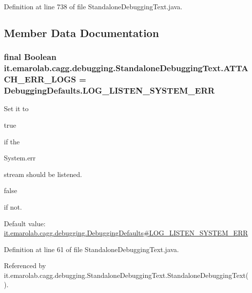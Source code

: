 Definition at line 738 of file Standalone\-Debugging\-Text.\-java.



\subsection{Member Data Documentation}
\hypertarget{classit_1_1emarolab_1_1cagg_1_1debugging_1_1StandaloneDebuggingText_a3c7f740a83d97241fa0ec2964f466884}{
\subsubsection[{A\-T\-T\-A\-C\-H\-\_\-\-E\-R\-R\-\_\-\-L\-O\-G\-S}]{\setlength{\rightskip}{0pt plus 5cm}final Boolean it.\-emarolab.\-cagg.\-debugging.\-Standalone\-Debugging\-Text.\-A\-T\-T\-A\-C\-H\-\_\-\-E\-R\-R\-\_\-\-L\-O\-G\-S = {\bf Debugging\-Defaults.\-L\-O\-G\-\_\-\-L\-I\-S\-T\-E\-N\-\_\-\-S\-Y\-S\-T\-E\-M\-\_\-\-E\-R\-R}\hspace{0.3cm}{\ttfamily [static]}}}\label{classit_1_1emarolab_1_1cagg_1_1debugging_1_1StandaloneDebuggingText_a3c7f740a83d97241fa0ec2964f466884}
Set it to
\begin{DoxyCode}
\textcolor{keyword}{true} 
\end{DoxyCode}
 if the
\begin{DoxyCode}
System.err 
\end{DoxyCode}
 stream should be listened.
\begin{DoxyCode}
\textcolor{keyword}{false} 
\end{DoxyCode}
 if not. \par
 Default value\-: \hyperlink{classit_1_1emarolab_1_1cagg_1_1debugging_1_1DebuggingDefaults_a99a53b1245a543cd658a05b4559a8902}{it.\-emarolab.\-cagg.\-debugging.\-Debugging\-Defaults\#\-L\-O\-G\-\_\-\-L\-I\-S\-T\-E\-N\-\_\-\-S\-Y\-S\-T\-E\-M\-\_\-\-E\-R\-R} 

Definition at line 61 of file Standalone\-Debugging\-Text.\-java.



Referenced by it.\-emarolab.\-cagg.\-debugging.\-Standalone\-Debugging\-Text.\-Standalone\-Debugging\-Text().

